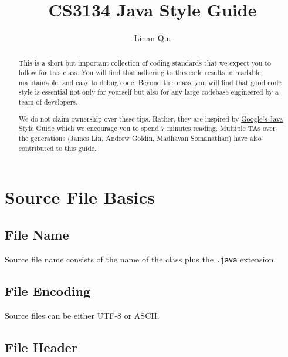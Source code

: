 \documentclass[11pt,DIV=23,landscape]{scrartcl}
\title{CS3134 Java Style Guide}
\author{Linan Qiu}
\date{}
\begin{document}
\maketitle

\begin{abstract}
This is a short but important collection of coding standards that we
expect you to follow for this class. You will find that adhering to this
code results in readable, maintainable, and easy to debug code. Beyond
this class, you will find that good code style is essential not only for
yourself but also for any large codebase engineered by a team of
developers.

We do not claim ownership over these tips. Rather, they are inspired by
\href{https://google.github.io/styleguide/javaguide.html}{Google's Java
Style Guide} which we encourage you to spend 7 minutes reading. Multiple
TAs over the generations (James Lin, Andrew Goldin, Madhavan
Somanathan) have also contributed to this guide.
\end{abstract}

\section{Source File Basics}\label{source-file-basics}

\begin{paracol}{2}
\begin{leftcolumn}
\subsection{File Name}\label{file-name}

Source file name consists of the name of the class plus the
\lstinline{.java} extension.
\end{leftcolumn}

\begin{rightcolumn}
\subsection{File Encoding}\label{file-encoding}

Source files can be either UTF-8 or ASCII.
\end{rightcolumn}
\end{paracol}

\subsection{File Header}\label{file-header}
\end{document}
